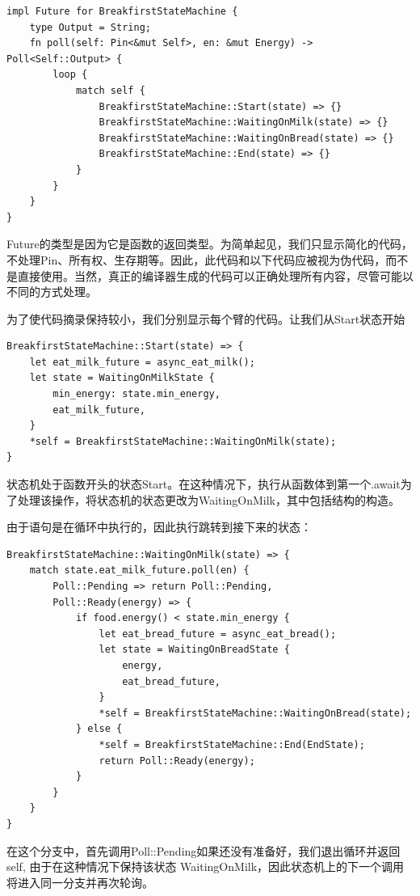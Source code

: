 \begin{lstlisting}[caption=Breakfirst的状态转换]
impl Future for BreakfirstStateMachine {
    type Output = String;
    fn poll(self: Pin<&mut Self>, en: &mut Energy) -> Poll<Self::Output> {
        loop {
            match self {
                BreakfirstStateMachine::Start(state) => {}
                BreakfirstStateMachine::WaitingOnMilk(state) => {}
                BreakfirstStateMachine::WaitingOnBread(state) => {}
                BreakfirstStateMachine::End(state) => {}
            }
        }
    }
}
\end{lstlisting}

Future的类型是因为它是函数的返回类型。为简单起见，我们只显示简化的代码，不处理Pin、所有权、生存期等。因此，此代码和以下代码应被视为伪代码，而不是直接使用。当然，真正的编译器生成的代码可以正确处理所有内容，尽管可能以不同的方式处理。


为了使代码摘录保持较小，我们分别显示每个臂的代码。让我们从Start状态开始

\begin{lstlisting}[caption = Start Branch]
BreakfirstStateMachine::Start(state) => {
    let eat_milk_future = async_eat_milk();
    let state = WaitingOnMilkState {
        min_energy: state.min_energy,
        eat_milk_future,
    }
    *self = BreakfirstStateMachine::WaitingOnMilk(state);
}
\end{lstlisting}

状态机处于函数开头的状态Start。在这种情况下，执行从函数体到第一个.await为了处理该操作，将状态机的状态更改为WaitingOnMilk，其中包括结构的构造。


由于语句是在循环中执行的，因此执行跳转到接下来的状态：

\begin{lstlisting}[caption=WaitingOnMilk Branch]
BreakfirstStateMachine::WaitingOnMilk(state) => {
    match state.eat_milk_future.poll(en) {
        Poll::Pending => return Poll::Pending,
        Poll::Ready(energy) => {
            if food.energy() < state.min_energy {
                let eat_bread_future = async_eat_bread();
                let state = WaitingOnBreadState {
                    energy,
                    eat_bread_future,
                }
                *self = BreakfirstStateMachine::WaitingOnBread(state);
            } else {
                *self = BreakfirstStateMachine::End(EndState);
                return Poll::Ready(energy);
            }
        }
    }
}
\end{lstlisting}

在这个分支中，首先调用Poll::Pending如果还没有准备好，我们退出循环并返回self, 由于在这种情况下保持该状态 WaitingOnMilk，因此状态机上的下一个调用将进入同一分支并再次轮询。

